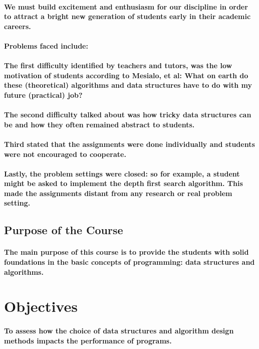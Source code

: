\documentclass{article}
\begin{document}
\paragraph{We must build excitement and enthusiasm for our discipline in order to attract a bright new generation of students early in their academic careers.}
\paragraph{Problems faced include:}
\paragraph{\cite{patel2014literature}The first difficulty identified by teachers and tutors, was the low motivation of students according to Mesialo, et al: What on earth do these (theoretical) algorithms and data structures have to do with my future (practical) job? }
\paragraph{The second difficulty talked about was how tricky data structures can be and how they often remained abstract to students. }
\paragraph{Third stated that the assignments were done individually and students were not encouraged to cooperate. }
\paragraph{Lastly, the problem settings were closed: so for example, a student might be asked to implement the depth first search algorithm. This made the assignments distant from any research or real problem setting.}
\subsection{Purpose of the Course}
\paragraph{The main purpose of this course is to provide the students with solid foundations in the basic concepts of programming: data structures and algorithms.}
\section{Objectives}
\paragraph{To assess how the choice of data structures and algorithm design methods impacts the performance of programs.}
\end{document}
